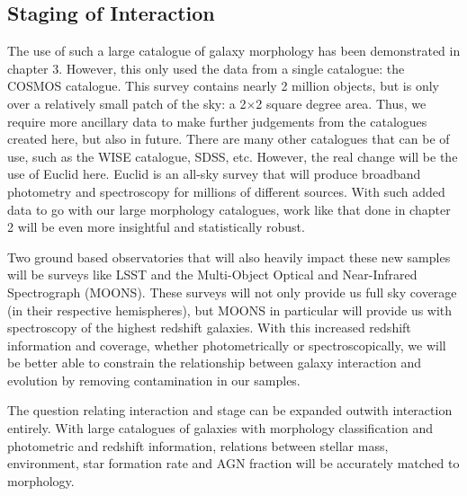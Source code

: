 \subsection{Staging of Interaction}
\noindent The use of such a large catalogue of galaxy morphology has been demonstrated in chapter 3. However, this only used the data from a single catalogue: the COSMOS catalogue. This survey contains nearly 2 million objects, but is only over a relatively small patch of the sky: a 2$\times$2 square degree area. Thus, we require more ancillary data to make further judgements from the catalogues created here, but also in future. There are many other catalogues that can be of use, such as the WISE catalogue, SDSS, etc. However, the real change will be the use of Euclid here. Euclid is an all-sky survey that will produce broadband photometry and spectroscopy for millions of different sources. With such added data to go with our large morphology catalogues, work like that done in chapter 2 will be even more insightful and statistically robust.

Two ground based observatories that will also heavily impact these new samples will be surveys like LSST and the Multi-Object Optical and Near-Infrared Spectrograph (MOONS). These surveys will not only provide us full sky coverage (in their respective hemispheres), but MOONS in particular will provide us with spectroscopy of the highest redshift galaxies. With this increased redshift information and coverage, whether photometrically or spectroscopically, we will be better able to constrain the relationship between galaxy interaction and evolution by removing contamination in our samples. 

The question relating interaction and stage can be expanded outwith interaction entirely. With large catalogues of galaxies with morphology classification and photometric and redshift information, relations between stellar mass, environment, star formation rate and AGN fraction will be accurately matched to morphology. 

